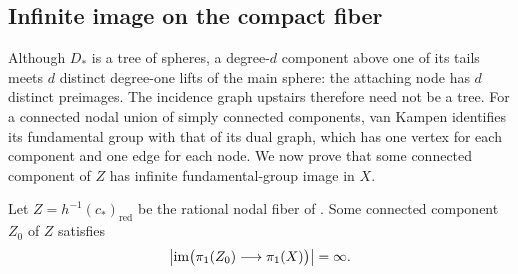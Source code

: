 \subsection{Infinite image on the compact fiber}

Although $D_*$ is a tree of spheres, a degree-$d$ component above
one of its tails meets $d$ distinct degree-one lifts of the main
sphere: the attaching node has $d$ distinct preimages. The incidence
graph upstairs therefore need not be a tree. For a connected nodal
union of simply connected components, van Kampen identifies its
fundamental group with that of its dual graph, which has one vertex
for each component and one edge for each node. We now prove that
some connected component of $Z$ has infinite fundamental-group image
in $X$.

\begin{lemma}
\label{lem:infinite-special-image}
Let $Z=h^{-1}(c_*)_{\mathrm{red}}$ be the rational nodal fiber of
. Some connected component $Z_0$ of $Z$ satisfies
\[
  \bigl|\operatorname{im}\bigl(\pi_1(Z_0)\longrightarrow\pi_1(X)\bigr)\bigr|
  =\infty.
\]
\end{lemma}

